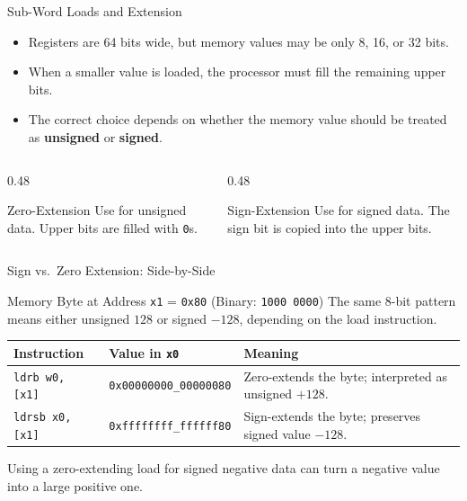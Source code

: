 \documentclass[aspectratio=169,11pt,t]{beamer}
\newcommand{\key}[1]{\textbf{#1}}
\newcommand{\bits}[1]{\texttt{#1}}
\newcommand{\hex}[1]{\texttt{0x#1}}
\newcommand{\code}[1]{\texttt{#1}}
\begin{document}
\begin{frame}{Sub-Word Loads and Extension}
\large
\begin{itemize}\setlength{\itemsep}{7pt}
  \item Registers are 64 bits wide, but memory values may be only 8, 16, or 32 bits.
  \item When a smaller value is loaded, the processor must fill the remaining upper bits.
  \item The correct choice depends on whether the memory value should be treated as \key{unsigned} or \key{signed}.
\end{itemize}

\vspace{0.25cm}
\begin{columns}[T,onlytextwidth]
\begin{column}{0.48\textwidth}
\begin{block}{Zero-Extension}
Use for unsigned data. Upper bits are filled with \bits{0}s.
\end{block}
\end{column}

\begin{column}{0.48\textwidth}
\begin{block}{Sign-Extension}
Use for signed data. The sign bit is copied into the upper bits.
\end{block}
\end{column}
\end{columns}
\end{frame}


\begin{frame}{Sign vs.\ Zero Extension: Side-by-Side}
\begin{block}{Memory Byte at Address \texttt{x1} = \hex{80} (Binary: \texttt{1000 0000})}
The same 8-bit pattern means either unsigned \(128\) or signed \(-128\), depending on the load instruction.
\end{block}

\vspace{0.15cm}
\begin{center}
\footnotesize
\setlength{\tabcolsep}{6pt}
\begin{tabular}{ll>{\raggedright\arraybackslash}p{5.8cm}}
\toprule
\textbf{Instruction} & \textbf{Value in \texttt{x0}} & \textbf{Meaning} \\
\midrule
\code{ldrb  w0, [x1]} & \texttt{0x00000000\_00000080} & Zero-extends the byte; interpreted as unsigned \(+128\). \\
\code{ldrsb x0, [x1]} & \texttt{0xffffffff\_ffffff80} & Sign-extends the byte; preserves signed value \(-128\). \\
\bottomrule
\end{tabular}
\end{center}

\vspace{0.25cm}
\normalsize
Using a zero-extending load for signed negative data can turn a negative value into a large positive one.
\end{frame}
\end{document}
